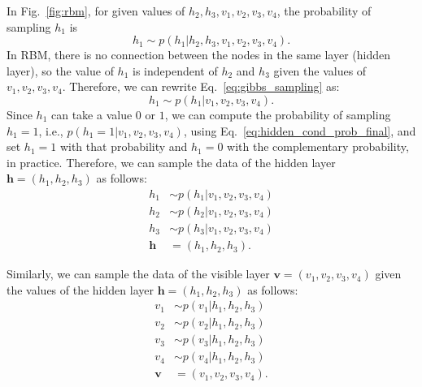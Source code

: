 \documentclass[10pt, a4paper]{article}
\begin{document}
In Fig.~\ref{fig:rbm}, for given values of $h_2,h_3,v_1,v_2,v_3,v_4$,
the probability of sampling $h_1$ is
\begin{equation}
  h_1\sim p(h_1|h_2,h_3,v_1,v_2,v_3,v_4).
  \label{eq:gibbs_sampling}
\end{equation}
In RBM, there is no connection between the nodes in the same layer (hidden layer),
so the value of $h_1$ is independent of $h_2$ and $h_3$ given the values of $v_1,v_2,v_3,v_4$.
Therefore, we can rewrite Eq.~\eqref{eq:gibbs_sampling} as:
\begin{equation}
  h_1\sim p(h_1|v_1,v_2,v_3,v_4).
\end{equation}
Since $h_1$ can take a value $0$ or $1$, we can compute the probability of sampling $h_1=1$, i.e.,
$p(h_1=1|v_1,v_2,v_3,v_4)$, using Eq.~\eqref{eq:hidden_cond_prob_final},
and set $h_1=1$ with that probability and $h_1=0$ with the complementary probability, in practice.
Therefore, we can sample the data of the hidden layer $\mathbf{h}=(h_1,h_2,h_3)$ as follows:
\begin{align}
  h_1 &\sim p(h_1|v_1,v_2,v_3,v_4) \nonumber \\
  h_2 &\sim p(h_2|v_1,v_2,v_3,v_4) \nonumber \\
  h_3 &\sim p(h_3|v_1,v_2,v_3,v_4) \nonumber  \\
  \mathbf{h} &= (h_1,h_2,h_3). \label{eq:sample_hidden_layer}
\end{align}

Similarly, we can sample the data of the visible layer $\mathbf{v}=(v_1,v_2,v_3,v_4)$
given the values of the hidden layer $\mathbf{h}=(h_1,h_2,h_3)$ as follows:
\begin{align}
  v_1 &\sim p(v_1|h_1,h_2,h_3) \nonumber \\
  v_2 &\sim p(v_2|h_1,h_2,h_3) \nonumber \\
  v_3 &\sim p(v_3|h_1,h_2,h_3) \nonumber  \\
  v_4 &\sim p(v_4|h_1,h_2,h_3) \nonumber  \\
  \mathbf{v} &= (v_1,v_2,v_3,v_4). \label{eq:sample_visible_layer}
\end{align}
\end{document}
